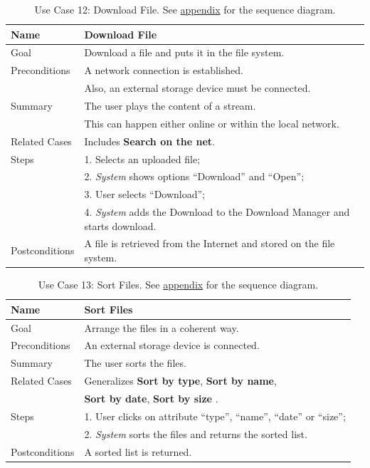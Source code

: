 \begin{table}[h!]
\centering
\begin{tabular}{|l|l|}
\hline
Name & Download File\\ \hline
Goal & Download a file and puts it in the file system.\\ \hline
Preconditions & A network connection is established. \\
& Also, an external storage device must be connected. \\ \hline
Summary & The user plays the content of a stream. \\
& This can happen either online or within the local network.\\ \hline

Related Cases & Includes \textbf{Search on the net}. \\ \hline
Steps &  1. Selects an uploaded file; \\
      &  2. \textit{System} shows options ``Download'' and ``Open''; \\
      &  3. User selects ``Download''; \\
      &  4. \textit{System} adds the Download to the Download Manager and starts download.
        \\ \hline
Postconditions & A file is retrieved from the Internet and stored on the file system.
\\ \hline
\end{tabular}
\caption{Use Case 12: Download File. See \hyperref[fig:req_seq6]{appendix} for the sequence diagram.}
\label{tab:UC12}
\end{table}

\begin{table}[h!]
\centering
\begin{tabular}{|l|l|}
\hline
Name & Sort Files\\ \hline
Goal & Arrange the files in a coherent way.\\ \hline
Preconditions & An external storage device is connected. \\ \hline
Summary & The user sorts the files.\\ \hline
Related Cases & Generalizes \textbf{Sort by type}, \textbf{Sort by name}, \\
& \textbf{Sort by date}, \textbf{Sort by size} . \\ \hline
Steps &  1. User clicks on attribute ``type'', ``name'', ``date'' or ``size''; \\
      &  2. \textit{System} sorts the files and returns the sorted list. 
        \\ \hline
Postconditions & A sorted list is returned.
\\ \hline
\end{tabular}
\caption{Use Case 13: Sort Files. See \hyperref[fig:req_seq7]{appendix} for the sequence diagram.}
\label{tab:UC13}
\end{table}

